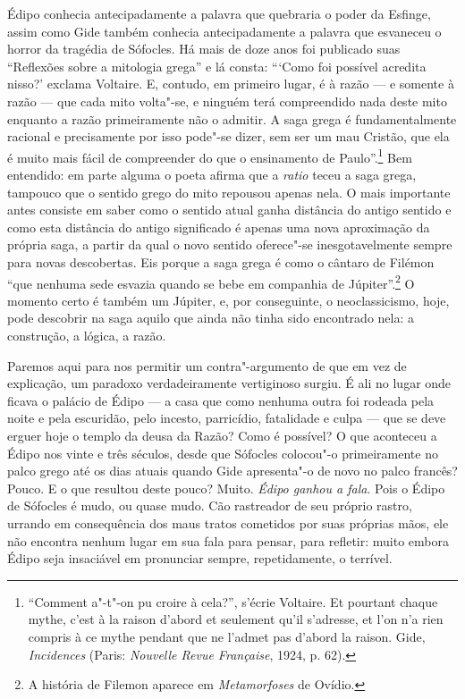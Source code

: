 Édipo conhecia antecipadamente a palavra que quebraria o poder da Esfinge,
assim como Gide também conhecia antecipadamente a palavra que
esvaneceu o horror da tragédia de Sófocles. Há mais de
doze anos foi publicado suas ``Reflexões sobre a mitologia grega'' e lá
consta: ```Como foi possível acredita nisso?' exclama Voltaire. E,
contudo, em primeiro lugar, é à razão --- e somente à razão --- que cada mito
volta"-se, e ninguém terá compreendido nada deste mito enquanto a razão primeiramente não
o admitir. A saga grega é fundamentalmente racional e precisamente por
isso pode"-se dizer, sem ser um mau Cristão, que ela é muito
mais fácil de compreender do que o ensinamento de Paulo''.\footnote{``Comment
  a"-t"-on pu croire à cela?'', s'écrie Voltaire. Et pourtant chaque
  mythe, c'est à la raison d'abord et seulement qu'il s'adresse, et l'on
  n'a rien compris à ce mythe pendant que ne l'admet pas d'abord la
  raison. Gide, \emph{Incidences} (Paris: \emph{Nouvelle Revue Française},
  1924, p. 62). \versal{[N. T.]}} Bem entendido: em parte alguma o poeta afirma que a
\emph{ratio} teceu a saga grega, tampouco que o sentido grego do mito
repousou apenas nela. O mais importante antes consiste em saber como o
sentido atual ganha distância do antigo sentido e como esta distância do antigo
significado é apenas uma nova aproximação da própria saga, a partir da
qual o novo sentido oferece"-se inesgotavelmente sempre para novas
descobertas. Eis porque a saga grega é como o cântaro de Filémon ``que
nenhuma sede esvazia quando se bebe em companhia de Júpiter''.\footnote{A história de Filemon aparece em \emph{Metamorfoses} de Ovídio. \versal{[N. E.]}} O
momento certo é também um Júpiter, e, por conseguinte, o neoclassicismo,
hoje, pode descobrir na saga aquilo que ainda não tinha sido
encontrado nela: a construção, a lógica, a razão.

Paremos aqui para nos permitir um contra"-argumento de que em vez de explicação,
um paradoxo verdadeiramente vertiginoso surgiu. É ali no lugar onde
ficava o palácio de Édipo --- a casa que como nenhuma outra foi rodeada
pela noite e pela escuridão, pelo incesto, parricídio, fatalidade e
culpa --- que se deve erguer hoje o templo da deusa da Razão? Como é
possível? O que aconteceu a Édipo nos vinte e três séculos, desde que
Sófocles colocou"-o primeiramente no palco grego até os dias atuais
quando Gide apresenta"-o de novo no palco francês? Pouco. E o que
resultou deste pouco? Muito. \emph{Édipo ganhou a fala}. Pois o Édipo de
Sófocles é mudo, ou quase mudo. Cão rastreador de seu próprio rastro,
urrando em consequência dos maus tratos cometidos por suas próprias
mãos, ele não encontra nenhum lugar em sua fala para pensar, para refletir: muito
embora Édipo seja insaciável em pronunciar sempre, repetidamente, o
terrível.


